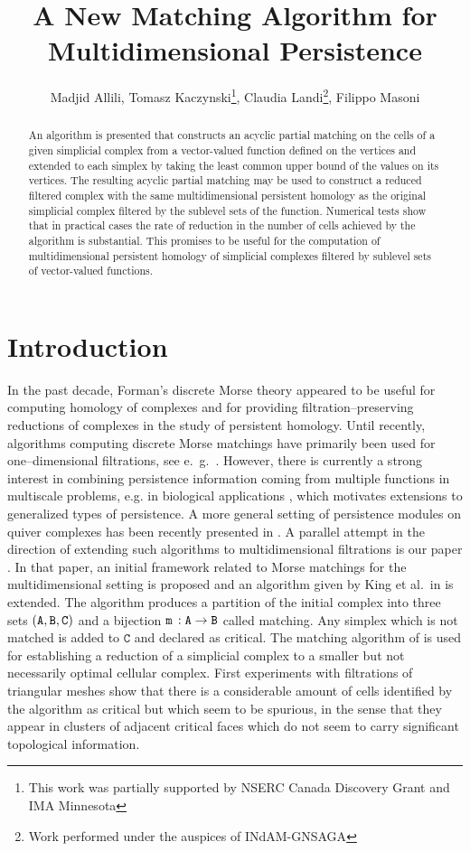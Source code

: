 \documentclass[12pt]{article}
\title{A New Matching Algorithm for Multidimensional Persistence}
\author{Madjid Allili, Tomasz Kaczynski\thanks{This work was partially supported by NSERC Canada Discovery Grant  and IMA Minnesota}, Claudia Landi\thanks{Work  performed under the auspices of INdAM-GNSAGA}, Filippo Masoni}
\newcommand{\ma}{\texttt{m}\,} \newcommand{\re}{\texttt{r}\,}
\newcommand{\sB}{\texttt{B}}
\newcommand{\sC}{\texttt{C}} \newcommand{\sD}{\texttt{D}} \newcommand{\sM}{\texttt{M}} \newcommand{\sL}{\texttt{L}}
\begin{document}
\maketitle

\begin{abstract}
An algorithm is presented that constructs an acyclic partial matching on the cells of a given simplicial complex from a vector-valued function defined on the vertices and extended to each simplex by taking the least common upper bound of the values on its vertices. The resulting acyclic partial matching may be used to construct a reduced filtered complex with the same multidimensional persistent homology as the original simplicial complex filtered by the sublevel sets of the function. Numerical tests show that in practical cases the rate of reduction in the number of cells achieved by the algorithm is substantial.  This promises to be useful for the computation of multidimensional persistent homology of  simplicial complexes filtered by  sublevel sets of vector-valued functions.
\end{abstract}

\section{Introduction}\label{sec:intro}

In the past decade, Forman's discrete Morse theory \cite{For98,Forman02} appeared to be useful for computing homology of complexes \cite{Har2014} and for providing filtration--preserving reductions of complexes in the study of persistent homology. Until recently, algorithms computing discrete Morse matchings have primarily been used for one--dimensional filtrations, see e.\ g.\ \cite{KinKnuMra05,RobWooShe11,MiNa}. However, there is currently a strong interest in combining persistence information coming from multiple functions in multiscale problems,  e.g. in biological applications  \cite{xia-wei}, which motivates extensions to generalized types of persistence. A more general setting of persistence modules on quiver complexes has been recently presented in \cite{Esc2014}. A parallel attempt in the direction of extending such algorithms to multidimensional filtrations  is our paper \cite{AlKaLa17}. In that paper, an initial framework related to Morse matchings for the multidimensional setting is proposed and an algorithm given by King et al.\ in \cite{KinKnuMra05} is extended. The algorithm produces a partition of the initial complex into three sets $(\sA,\sB,\sC)$ and a bijection $\ma: \sA \to \sB$ called matching. Any simplex which is not matched is added to $\sC$ and declared as critical. The matching algorithm of \cite{AlKaLa17} is used for establishing a reduction of a simplicial complex to a smaller but not necessarily optimal cellular complex. First experiments with filtrations of triangular meshes show that there is a considerable amount of cells identified by the algorithm as critical but which seem to be spurious, in the sense that they appear in clusters of adjacent critical faces which do not seem to carry significant topological information.
\end{document}
